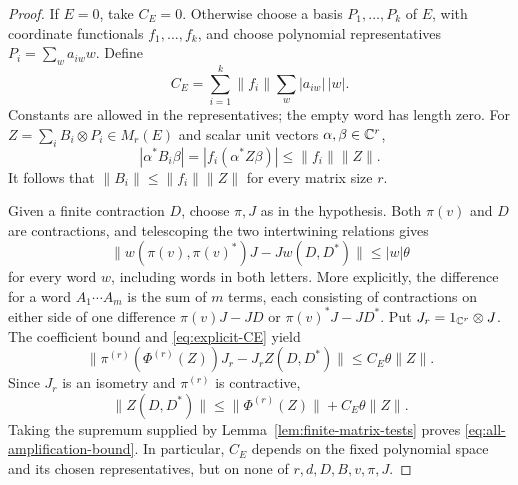 \begin{proof}
If $E=0$, take $C_E=0$.  Otherwise choose a basis $P_1,\ldots,P_k$
of $E$, with coordinate functionals $f_1,\ldots,f_k$, and choose
polynomial representatives
$P_i=\sum_w a_{iw}w$.  Define
\begin{equation}\label{eq:explicit-CE}
 C_E=\sum_{i=1}^k\|f_i\|\sum_w|a_{iw}|\,|w|.
\end{equation}
Constants are allowed in the representatives; the empty word has
length zero.  For $Z=\sum_i B_i\otimes P_i\in M_r(E)$ and scalar
unit vectors $\alpha,\beta\in\mathbb C^r$,
\[
 |\alpha^*B_i\beta|
 =|f_i(\alpha^*Z\beta)|\leq\|f_i\|\|Z\|.
\]
It follows that $\|B_i\|\leq\|f_i\|\|Z\|$ for every matrix size $r$.

Given a finite contraction $D$, choose $\pi,J$ as in the hypothesis.
Both $\pi(v)$ and $D$ are contractions, and telescoping the two
intertwining relations gives
\[
 \|w(\pi(v),\pi(v)^*)J-Jw(D,D^*)\|\leq|w|\theta
\]
for every word $w$, including words in both letters.  More explicitly,
the difference for a word $A_1\cdots A_m$ is the sum of $m$ terms,
each consisting of contractions on either side of one difference
$\pi(v)J-JD$ or $\pi(v)^*J-JD^*$.  Put $J_r=1_{\mathbb C^r}\otimes J$.
The coefficient bound and \eqref{eq:explicit-CE} yield
\[
 \|\pi^{(r)}(\Phi^{(r)}(Z))J_r-J_r Z(D,D^*)\|
 \leq C_E\theta\|Z\|.
\]
Since $J_r$ is an isometry and $\pi^{(r)}$ is contractive,
\[
 \|Z(D,D^*)\|\leq\|\Phi^{(r)}(Z)\|+C_E\theta\|Z\|.
\]
Taking the supremum supplied by Lemma~\ref{lem:finite-matrix-tests}
proves \eqref{eq:all-amplification-bound}.  In particular, $C_E$
depends on the fixed polynomial space and its chosen representatives,
but on none of $r,d,D,B,v,\pi,J$.
\end{proof}

